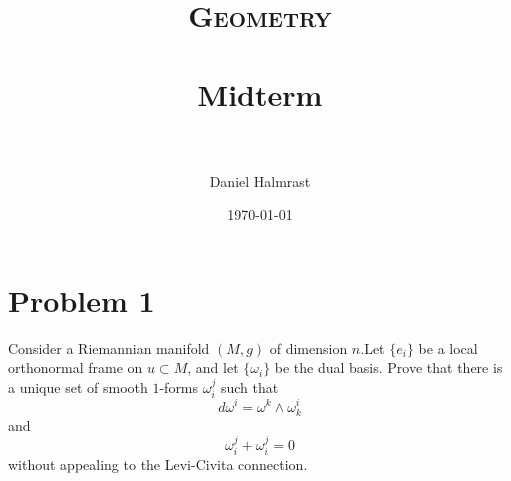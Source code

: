 \documentclass[fontsize=11pt]{scrartcl} %
\title{	
\normalfont \normalsize 
\textsc{Geometry} \\ [25pt] %
\horrule{0.5pt} \\[0.4cm] %
\huge Midterm \\ %
\horrule{2pt} \\[0.5cm] %
}
\author{Daniel Halmrast} %
\date{\normalsize\today} %
\numberwithin{equation}{section} %
\numberwithin{figure}{section} %
\numberwithin{table}{section} %
\begin{document}
\maketitle %

\section*{Problem 1}
Consider a Riemannian manifold $(M,g)$ of dimension $n$.Let $\{e_i\}$ be a local
orthonormal frame on $u\subset M$, and let $\{\omega_i\}$ be the dual basis.
Prove that there is a unique set of smooth $1$-forms $\omega^j_i$ such that
\[
    d\omega^i = \omega^k\wedge\omega_k^i
\]
and
\[
    \omega_i^j + \omega^j_i = 0
\]
without appealing to the Levi-Civita connection.
\\
\\
\end{document}
